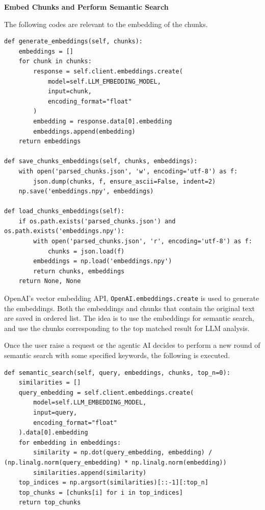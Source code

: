 \vspace{0.1in}
\noindent \textbf{Embed Chunks and Perform Semantic Search}
\vspace{0.1in}

The following codes are relevant to the embedding of the chunks.

\begin{lstlisting}
def generate_embeddings(self, chunks):
    embeddings = []
    for chunk in chunks:
        response = self.client.embeddings.create(
            model=self.LLM_EMBEDDING_MODEL,
            input=chunk,
            encoding_format="float"
        )
        embedding = response.data[0].embedding
        embeddings.append(embedding)
    return embeddings

def save_chunks_embeddings(self, chunks, embeddings):
    with open('parsed_chunks.json', 'w', encoding='utf-8') as f:
        json.dump(chunks, f, ensure_ascii=False, indent=2)
    np.save('embeddings.npy', embeddings)

def load_chunks_embeddings(self):
    if os.path.exists('parsed_chunks.json') and os.path.exists('embeddings.npy'):
        with open('parsed_chunks.json', 'r', encoding='utf-8') as f:
            chunks = json.load(f)
        embeddings = np.load('embeddings.npy')
        return chunks, embeddings
    return None, None
\end{lstlisting}

OpenAI's vector embedding API, \verb|OpenAI.embeddings.create| is used to generate the embeddings. Both the embeddings and chunks that contain the original text are saved in ordered list. The idea is to use the embeddings for semantic search, and use the chunks corresponding to the top matched result for LLM analysis. 

Once the user raise a request or the agentic AI decides to perform a new round of semantic search with some specified keywords, the following is executed.

\begin{lstlisting}
def semantic_search(self, query, embeddings, chunks, top_n=0):
    similarities = []
    query_embedding = self.client.embeddings.create(
        model=self.LLM_EMBEDDING_MODEL,
        input=query,
        encoding_format="float"
    ).data[0].embedding
    for embedding in embeddings:
        similarity = np.dot(query_embedding, embedding) / (np.linalg.norm(query_embedding) * np.linalg.norm(embedding))
        similarities.append(similarity)
    top_indices = np.argsort(similarities)[::-1][:top_n]
    top_chunks = [chunks[i] for i in top_indices]
    return top_chunks
\end{lstlisting}

